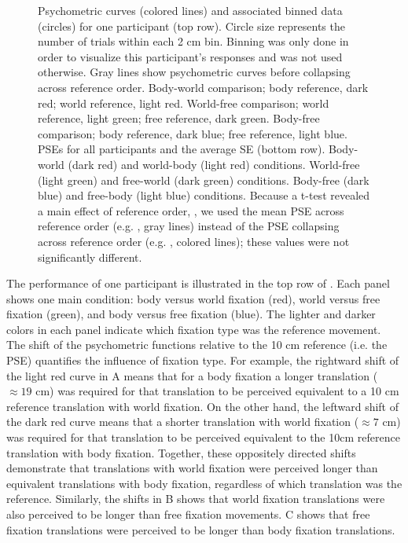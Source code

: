 \begin{figure}
    \caption{Psychometric curves (colored lines) and associated binned data (circles) for one participant (top row). Circle size represents the number of trials within each 2 \si{\centi\metre} bin. Binning was only done in order to visualize this participant's responses and was not used otherwise. Gray lines show psychometric curves before collapsing across reference order.  Body-world comparison; body reference, dark red; world reference, light red.  World-free comparison; world reference, light green; free reference, dark green.   Body-free comparison; body reference, dark blue; free reference, light blue. \newline    
PSEs for all participants and the average {\textpm}SE (bottom row).  Body-world (dark red) and world-body (light red) conditions.  World-free (light green) and free-world (dark green) conditions.  Body-free (dark blue) and free-body (light blue) conditions. Because a t-test revealed a main effect of reference order, , we used the mean PSE across reference order (e.g. , gray lines) instead of the PSE collapsing across reference order (e.g. , colored lines); these values were not significantly different.}
    \label{p3:fig2}    
\end{figure}

The performance of one participant is illustrated in the top row of . Each panel shows one main condition: body versus world fixation (red), world versus free fixation (green), and body versus free fixation (blue). The lighter and darker colors in each panel indicate which fixation type was the reference movement. The shift of the psychometric functions relative to the 10 \si{\centi\metre} reference (i.e. the PSE) quantifies the influence of fixation type. For example, the rightward shift of the light red curve in A means that for a body fixation a longer translation ($\approx 19$ \si{\centi\metre}) was required for that translation to be perceived equivalent to a 10 \si{\centi\metre} reference translation with world fixation. On the other hand, the leftward shift of the dark red curve means that a shorter translation with world fixation ($\approx 7$ \si{\centi\metre}) was required for that translation to be perceived equivalent to the 10cm reference translation with body fixation. Together, these oppositely directed shifts demonstrate that translations with world fixation were perceived longer than equivalent translations with body fixation, regardless of which translation was the reference. Similarly, the shifts in B shows that world fixation translations were also perceived to be longer than free fixation movements. C shows that free fixation translations were perceived to be longer than body fixation translations.

